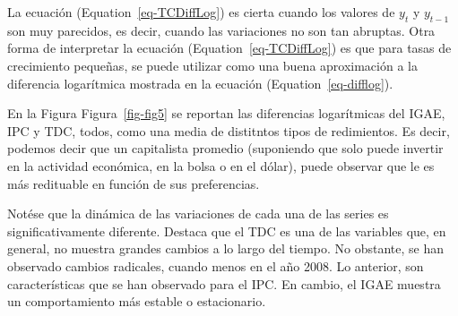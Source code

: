 \documentclass[
  a4paper,
]{article}
\begin{document}
La ecuación (Equation~\ref{eq-TCDiffLog}) es cierta cuando los valores
de \(y_t\) y \(y_{t-1}\) son muy parecidos, es decir, cuando las
variaciones no son tan abruptas. Otra forma de interpretar la ecuación
(Equation~\ref{eq-TCDiffLog}) es que para tasas de crecimiento pequeñas,
se puede utilizar como una buena aproximación a la diferencia
logarítmica mostrada en la ecuación (Equation~\ref{eq-difflog}).

En la Figura Figura~\ref{fig-fig5} se reportan las diferencias
logarítmicas del IGAE, IPC y TDC, todos, como una media de distitntos
tipos de redimientos. Es decir, podemos decir que un capitalista
promedio (suponiendo que solo puede invertir en la actividad económica,
en la bolsa o en el dólar), puede observar que le es más redituable en
función de sus preferencias.

Notése que la dinámica de las variaciones de cada una de las series es
significativamente diferente. Destaca que el TDC es una de las variables
que, en general, no muestra grandes cambios a lo largo del tiempo. No
obstante, se han observado cambios radicales, cuando menos en el año
2008. Lo anterior, son características que se han observado para el IPC.
En cambio, el IGAE muestra un comportamiento más estable o estacionario.


\printbibliography
\end{document}

